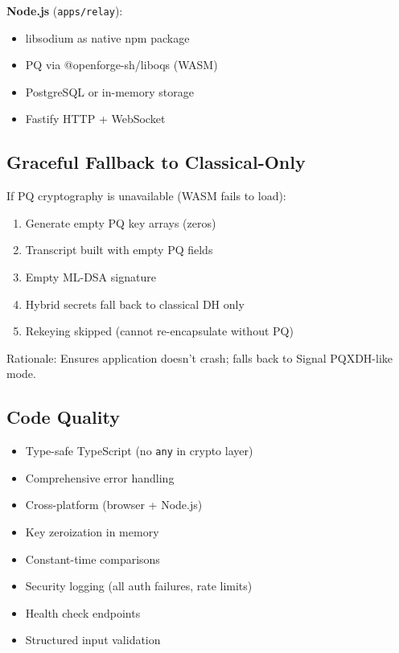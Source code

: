 \documentclass[11pt,a4paper,oneside]{article}
\begin{document}
\textbf{Node.js} (\texttt{apps/relay}):
\begin{itemize}
\item libsodium as native npm package
\item PQ via @openforge-sh/liboqs (WASM)
\item PostgreSQL or in-memory storage
\item Fastify HTTP + WebSocket
\end{itemize}

\subsection{Graceful Fallback to Classical-Only}

If PQ cryptography is unavailable (WASM fails to load):

\begin{enumerate}
\item Generate empty PQ key arrays (zeros)
\item Transcript built with empty PQ fields
\item Empty ML-DSA signature
\item Hybrid secrets fall back to classical DH only
\item Rekeying skipped (cannot re-encapsulate without PQ)
\end{enumerate}

Rationale: Ensures application doesn't crash; falls back to Signal PQXDH-like mode.

\subsection{Code Quality}

\begin{itemize}
\item Type-safe TypeScript (no \texttt{any} in crypto layer)
\item Comprehensive error handling
\item Cross-platform (browser + Node.js)
\item Key zeroization in memory
\item Constant-time comparisons
\item Security logging (all auth failures, rate limits)
\item Health check endpoints
\item Structured input validation
\end{itemize}

\end{document}
